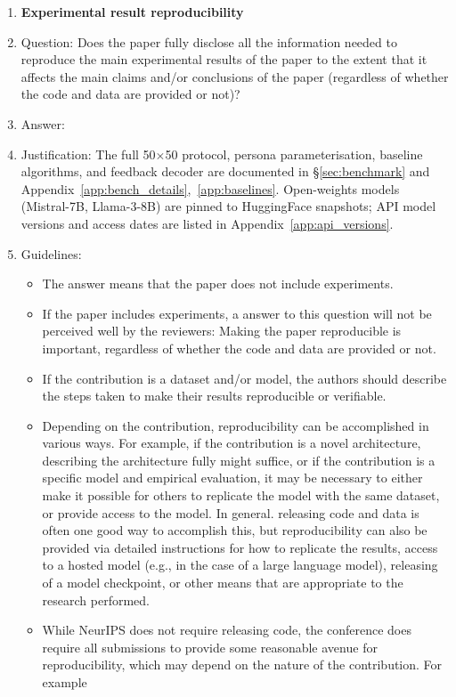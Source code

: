 \documentclass[11pt]{article}
\begin{document}
\begin{enumerate}
    \item {\bf Experimental result reproducibility}
    \item[] Question: Does the paper fully disclose all the information needed to reproduce the main experimental results of the paper to the extent that it affects the main claims and/or conclusions of the paper (regardless of whether the code and data are provided or not)?
    \item[] Answer: \answerYes{}
    \item[] Justification: The full 50$\times$50 protocol, persona parameterisation, baseline algorithms, and feedback decoder are documented in \S\ref{sec:benchmark} and Appendix~\ref{app:bench_details},~\ref{app:baselines}. Open-weights models (Mistral-7B, Llama-3-8B) are pinned to HuggingFace snapshots; API model versions and access dates are listed in Appendix~\ref{app:api_versions}.
    \item[] Guidelines:
    \begin{itemize}
        \item The answer \answerNA{} means that the paper does not include experiments.
        \item If the paper includes experiments, a \answerNo{} answer to this question will not be perceived well by the reviewers: Making the paper reproducible is important, regardless of whether the code and data are provided or not.
        \item If the contribution is a dataset and\slash or model, the authors should describe the steps taken to make their results reproducible or verifiable.
        \item Depending on the contribution, reproducibility can be accomplished in various ways. For example, if the contribution is a novel architecture, describing the architecture fully might suffice, or if the contribution is a specific model and empirical evaluation, it may be necessary to either make it possible for others to replicate the model with the same dataset, or provide access to the model. In general. releasing code and data is often one good way to accomplish this, but reproducibility can also be provided via detailed instructions for how to replicate the results, access to a hosted model (e.g., in the case of a large language model), releasing of a model checkpoint, or other means that are appropriate to the research performed.
        \item While NeurIPS does not require releasing code, the conference does require all submissions to provide some reasonable avenue for reproducibility, which may depend on the nature of the contribution. For example

\end{itemize}
\end{enumerate}
\end{document}
